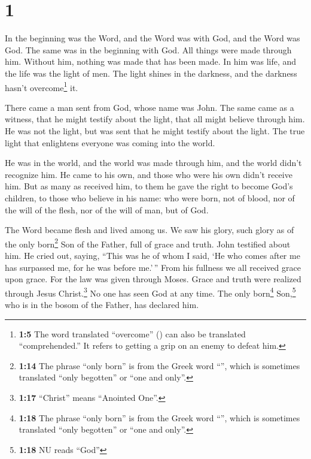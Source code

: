 \hypertarget{section}{%
\section{1}\label{section}}

 In the beginning was the Word, and the Word was with God,
and the Word was God.  The same was in the beginning with
God.  All things were made through him. Without him,
nothing was made that has been made.  In him was life, and
the life was the light of men.  The light shines in the
darkness, and the darkness hasn't overcome\footnote{\textbf{1:5} The
  word translated ``overcome'' () can also be
  translated ``comprehended.'' It refers to getting a grip on an enemy
  to defeat him.} it.

 There came a man sent from God, whose name was John.
 The same came as a witness, that he might testify about
the light, that all might believe through him.  He was not
the light, but was sent that he might testify about the light.
 The true light that enlightens everyone was coming into
the world.

 He was in the world, and the world was made through him,
and the world didn't recognize him.  He came to his own,
and those who were his own didn't receive him.  But as
many as received him, to them he gave the right to become God's
children, to those who believe in his name:  who were
born, not of blood, nor of the will of the flesh, nor of the will of
man, but of God.

 The Word became flesh and lived among us. We saw his
glory, such glory as of the only born\footnote{\textbf{1:14} The phrase
  ``only born'' is from the Greek word ``'', which is
  sometimes translated ``only begotten'' or ``one and only''.} Son of
the Father, full of grace and truth.  John testified
about him. He cried out, saying, ``This was he of whom I said, `He who
comes after me has surpassed me, for he was before me.'\,''
 From his fullness we all received grace upon grace.
 For the law was given through Moses. Grace and truth
were realized through Jesus Christ.\footnote{\textbf{1:17} ``Christ''
  means ``Anointed One''.}  No one has seen God at any
time. The only born\footnote{\textbf{1:18} The phrase ``only born'' is
  from the Greek word ``'', which is sometimes
  translated ``only begotten'' or ``one and only''.} Son,\footnote{\textbf{1:18}
  NU reads ``God''} who is in the bosom of the Father, has declared him.

